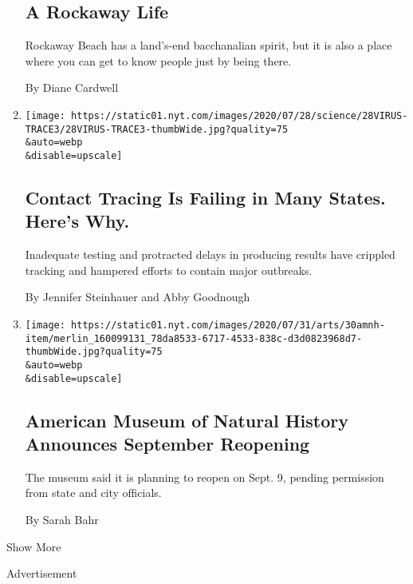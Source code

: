 \begin{enumerate}
{  \subsection{A Rockaway Life}\label{a-rockaway-life}}

  Rockaway Beach has a land's-end bacchanalian spirit, but it is also a
  place where you can get to know people just by being there.

  By Diane Cardwell
\item
  \href{/2020/07/31/health/covid-contact-tracing-tests.html}{}

  \texttt{[image: https://static01.nyt.com/images/2020/07/28/science/28VIRUS-TRACE3/28VIRUS-TRACE3-thumbWide.jpg?quality=75\\\&auto=webp\\\&disable=upscale]}

  \hypertarget{contact-tracing-is-failing-in-many-states-heres-why}{%
  \subsection{Contact Tracing Is Failing in Many States. Here's
  Why.}\label{contact-tracing-is-failing-in-many-states-heres-why}}

  Inadequate testing and protracted delays in producing results have
  crippled tracking and hampered efforts to contain major outbreaks.

  By Jennifer Steinhauer and Abby Goodnough
\item
  \href{/2020/07/30/arts/design/american-museum-of-natural-history-reopen-covid.html}{}

  \texttt{[image: https://static01.nyt.com/images/2020/07/31/arts/30amnh-item/merlin\_160099131\_78da8533-6717-4533-838c-d3d0823968d7-thumbWide.jpg?quality=75\\\&auto=webp\\\&disable=upscale]}

  \hypertarget{american-museum-of-natural-history-announces-september-reopening}{%
  \subsection{American Museum of Natural History Announces September
  Reopening}\label{american-museum-of-natural-history-announces-september-reopening}}

  The museum said it is planning to reopen on Sept. 9, pending
  permission from state and city officials.

  By Sarah Bahr
\end{enumerate}

Show More

Advertisement

